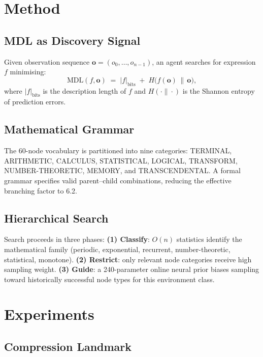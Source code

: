 \documentclass{article}
\begin{document}
\section{Method}

\subsection{MDL as Discovery Signal}

Given observation sequence $\mathbf{o} = (o_0,\ldots,o_{n-1})$,
an agent searches for expression $f$ minimising:
\begin{equation}
  \mathrm{MDL}(f,\mathbf{o})
  \;=\; |f|_{\text{bits}}
  \;+\; H\!\bigl(f(\mathbf{o})\,\|\,\mathbf{o}\bigr),
\end{equation}
where $|f|_{\text{bits}}$ is the description length of $f$ and
$H(\cdot\|\cdot)$ is the Shannon entropy of prediction errors.

\subsection{Mathematical Grammar}

The 60-node vocabulary is partitioned into nine categories:
TERMINAL, ARITHMETIC, CALCULUS, STATISTICAL, LOGICAL, TRANSFORM,
NUMBER-THEORETIC, MEMORY, and TRANSCENDENTAL.
A formal grammar specifies valid parent--child combinations,
reducing the effective branching factor to 6.2.

\subsection{Hierarchical Search}

Search proceeds in three phases:
\textbf{(1) Classify}: $O(n)$ statistics identify the mathematical family
(periodic, exponential, recurrent, number-theoretic, statistical, monotone).
\textbf{(2) Restrict}: only relevant node categories receive high sampling weight.
\textbf{(3) Guide}: a 240-parameter online neural prior biases sampling
toward historically successful node types for this environment class.

\section{Experiments}

\subsection{Compression Landmark}
\end{document}

